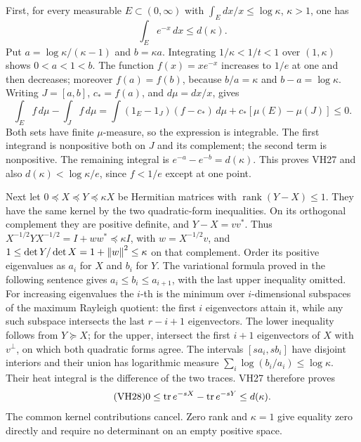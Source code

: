 First, for every measurable \(E\subset(0,\infty)\) with
\(\int_E dx/x\le\log\kappa\), \(\kappa>1\), one has
\begin{equation}\tag{VH27}\label{hvh:VH27}
\int_E e^{-x}\,dx\le d(\kappa).
\end{equation}
Put \(a=\log\kappa/(\kappa-1)\) and \(b=\kappa a\).
Integrating \(1/\kappa<1/t<1\) over \((1,\kappa)\) shows
\(0<a<1<b\). The function \(f(x)=xe^{-x}\) increases to \(1/e\)
at one and then decreases; moreover \(f(a)=f(b)\), because
\(b/a=\kappa\) and \(b-a=\log\kappa\).
Writing \(J=[a,b]\), \(c_*=f(a)\), and \(d\mu=dx/x\), gives
\[
\int_E f\,d\mu-\int_J f\,d\mu
=\int(1_E-1_J)(f-c_*)\,d\mu
+c_*[\mu(E)-\mu(J)]\le0.
\]
Both sets have finite \(\mu\)-measure, so the expression is integrable.
The first integrand is nonpositive both on \(J\) and its complement;
the second term is nonpositive. The remaining integral is
\(e^{-a}-e^{-b}=d(\kappa)\). This proves VH27 and also
\(d(\kappa)<\log\kappa/e\), since \(f<1/e\) except at one point.

Next let \(0\preceq X\preceq Y\preceq\kappa X\) be Hermitian
matrices with \(\operatorname{rank}(Y-X)\le1\). They have the same
kernel by the two quadratic-form inequalities. On its orthogonal
complement they are positive definite, and
\(Y-X=vv^*\). Thus
\(X^{-1/2}YX^{-1/2}=I+ww^*\preceq\kappa I\), with
\(w=X^{-1/2}v\), and
\(1\le\det Y/\det X=1+\left\lVert w\right\rVert^2\le\kappa\) on that complement.
Order its positive eigenvalues as \(a_i\) for \(X\) and \(b_i\) for
\(Y\). The variational formula proved in the following sentence gives
\(a_i\le b_i\le a_{i+1}\), with the last upper inequality omitted.
For increasing eigenvalues the \(i\)-th is the minimum over
\(i\)-dimensional subspaces of the maximum Rayleigh quotient: the
first \(i\) eigenvectors attain it, while any such subspace intersects
the last \(r-i+1\) eigenvectors. The lower inequality follows from
\(Y\succeq X\); for the upper, intersect the first \(i+1\) eigenvectors
of \(X\) with \(v^\perp\), on which both quadratic forms agree.
The intervals \([sa_i,sb_i]\) have disjoint interiors and their union
has logarithmic measure \(\sum_i\log(b_i/a_i)\le\log\kappa\).
Their heat integral is the difference of the two traces. VH27 therefore
proves
\begin{equation}\tag{VH28}\label{hvh:VH28}
0\le\operatorname{tr} e^{-sX}-\operatorname{tr} e^{-sY}\le d(\kappa).
\end{equation}
The common kernel contributions cancel. Zero rank and \(\kappa=1\)
give equality zero directly and require no determinant on an empty
positive space.

